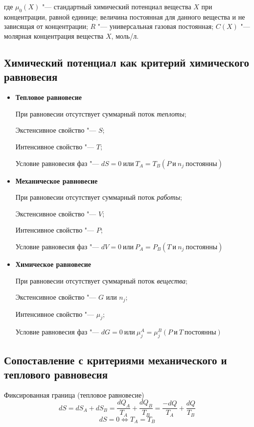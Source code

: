 \documentclass[12pt,a4paper,oneside]{book}
\begin{document}
где $\mu_0(X)$ "--- стандартный химический потенциал вещества $X$ при концентрации, равной единице; величина постоянная для данного вещества и не зависящая от концентрации; $R$ "--- универсальная газовая постоянная; $C(X)$ "--- молярная концентрация вещества $X$, моль/л.


\subsection{Химический потенциал как критерий химического равновесия}

\begin{itemize}
\item {\bf Тепловое равновесие}

При равновесии отсутствует суммарный поток {\it теплоты};

Экстенсивное свойство "--- $S$;

Интенсивное свойство "--- $T$;

Условие равновесия фаз "--- $dS=0\ \text{или}\ T_A=T_B (P\ \text{и}\ n_j\ \text{постоянны})$

\item {\bf Механическое равновесие}

При равновесии отсутствует суммарный поток {\it работы};

Экстенсивное свойство "--- $V$;

Интенсивное свойство "--- $P$;

Условие равновесия фаз "--- $dV=0\ \text{или}\ P_A=P_B (T\ \text{и}\ n_j\ \text{постоянны})$

\item {\bf Химическое равновесие}

При равновесии отсутствует суммарный поток {\it вещества};

Экстенсивное свойство "--- $G$ или $n_j$;

Интенсивное свойство "--- $\mu_j$;

Условие равновесия фаз "--- $dG=0\ \text{или}\ \mu_j^A=\mu_j^B (P\ \text{и}\ T\ \text{постоянны})$
\end{itemize}


\subsection{Сопоставление с критериями механического и теплового равновесия}

Фиксированная граница (тепловое равновесие)
\begin{equation}
	dS = dS_A+dS_B=\frac{dQ_A}{T_A}+\frac{dQ_B}{T_B}= \frac{-dQ}{T_A}+\frac{dQ}{T_B} 
\end{equation}
\begin{equation}
	dS = 0 \Leftrightarrow T_A=T_B
\end{equation}
		
\end{document}
